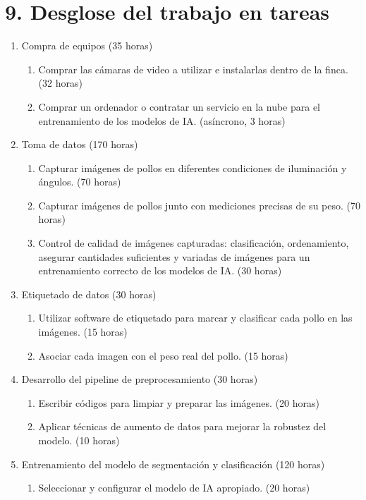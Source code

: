 \documentclass[
11pt, %
]{charter}
\begin{document}
\section{9. Desglose del trabajo en tareas}
\label{sec:wbs}

\begin{enumerate}
\item Compra de equipos (35 horas)
	\begin{enumerate}
	\item Comprar las cámaras de video a utilizar e instalarlas dentro de la finca. (32 horas)
	\item Comprar un ordenador o contratar un servicio en la nube para el entrenamiento de los modelos de IA. (asíncrono, 3 horas)
	\end{enumerate}
\item Toma de datos (170 horas)
	\begin{enumerate}
	\item Capturar imágenes de pollos en diferentes condiciones de iluminación y ángulos. (70 horas)
	\item Capturar imágenes de pollos junto con mediciones precisas de su peso. (70 horas)
	\item Control de calidad de imágenes capturadas: clasificación, ordenamiento, asegurar cantidades suficientes y variadas de imágenes para un entrenamiento correcto de los modelos de IA. (30 horas)
	\end{enumerate}
\item Etiquetado de datos (30 horas)
	\begin{enumerate}
	\item Utilizar software de etiquetado para marcar y clasificar cada pollo en las imágenes. (15 horas)
	\item Asociar cada imagen con el peso real del pollo. (15 horas)
	\end{enumerate}
\item Desarrollo del pipeline de preprocesamiento (30 horas)
	\begin{enumerate}
	\item Escribir códigos para limpiar y preparar las imágenes. (20 horas)
	\item Aplicar técnicas de aumento de datos para mejorar la robustez del modelo. (10 horas)
	\end{enumerate}
\item Entrenamiento del modelo de segmentación y clasificación (120 horas)
	\begin{enumerate}
	\item Seleccionar y configurar el modelo de IA apropiado. (20 horas)

\end{enumerate}
\end{enumerate}
\end{document}
